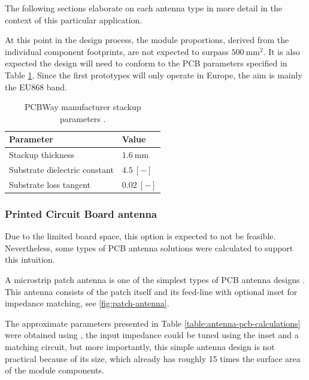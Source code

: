 The following sections elaborate on each antenna type in more detail in the context of this particular application. 

At this point in the design process, the module proportions, derived from the individual component footprints, are not expected to surpass $500~\mathrm{mm^2}$. It is also expected the design will need to conform to the PCB parameters specified in Table \ref{table:pcb-parameters}. Since the first prototypes will only operate in Europe, the aim is mainly the EU868 band.

\begin{table}[H]
\begin{center}
\caption{\label{table:pcb-parameters}PCBWay manufacturer stackup parameters \cite{pcbway_stackup_2024}.}
    \begin{tabular}{|l|l|} \hline
    \textbf{Parameter}            & \textbf{Value} \\ \hline
    Stackup thickness             & $1.6~\mathrm{mm}$ \\ \hline
    Substrate dielectric constant & $4.5~\mathrm{[-]}$ \\ \hline
    Substrate loss tangent        & $0.02~\mathrm{[-]}$ \\ \hline
    \end{tabular}
\end{center}
\end{table}

\subsubsection{Printed Circuit Board antenna}
Due to the limited board space, this option is expected to not be feasible. Nevertheless, some types of PCB antenna solutions were calculated to support this intuition.

A microstrip patch antenna is one of the simplest types of PCB antenna designs \cite{zachariah_peterson_microstrip_2022,wallace_an058_nodate}. This antenna consists of the patch itself and its feed-line with optional inset for impedance matching, see \ref{fig:patch-antenna}. 

The approximate parameters presented in Table \ref{table:antenna-pcb-calculations} were obtained using \cite{zachariah_peterson_microstrip_2022}, the input impedance could be tuned using the inset and a matching circuit, but more importantly, this simple antenna design is not practical because of its size, which already has roughly 15 times the surface area of the module components.


